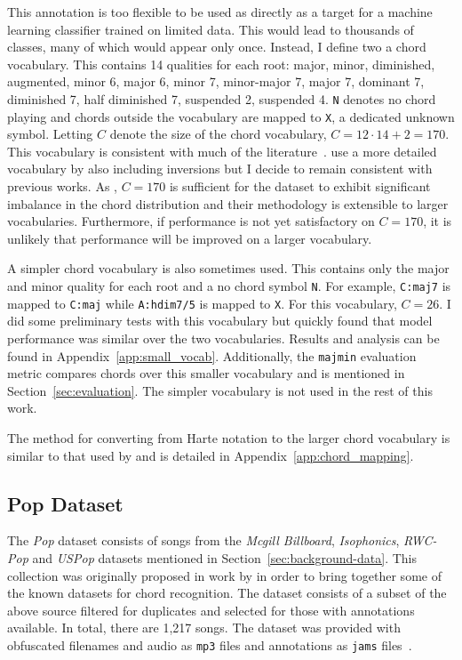 This annotation is too flexible to be used as directly as a target for a machine learning classifier trained on limited data. This would lead to thousands of classes, many of which would appear only once. Instead, I define two a chord vocabulary. This contains 14 qualities for each root: major, minor, diminished, augmented, minor 6, major 6, minor 7, minor-major 7, major 7, dominant 7, diminished 7, half diminished 7, suspended 2, suspended 4. \texttt{N} denotes no chord playing and chords outside the vocabulary are mapped to \texttt{X}, a dedicated unknown symbol. Letting $C$ denote the size of the chord vocabulary, $C=12\cdot14 + 2 = 170$. This vocabulary is consistent with much of the literature~\citep{StructuredTraining,FourTimelyInsights,ACRLargeVocab1}. \citet{ACRLargeVocab1} use a more detailed vocabulary by also including inversions but I decide to remain consistent with previous works. As \citet{StructuredTraining}, $C=170$ is sufficient for the dataset to exhibit significant imbalance in the chord distribution and their methodology is extensible to larger vocabularies. Furthermore, if performance is not yet satisfactory on $C=170$, it is unlikely that performance will be improved on a larger vocabulary.

A simpler chord vocabulary is also sometimes used. This contains only the major and minor quality for each root and a no chord symbol \texttt{N}. For example, \texttt{C:maj7} is mapped to \texttt{C:maj} while \texttt{A:hdim7/5} is mapped to \texttt{X}. For this vocabulary, $C=26$. I did some preliminary tests with this vocabulary but quickly found that model performance was similar over the two vocabularies. Results and analysis can be found in Appendix~\ref{app:small_vocab}. Additionally, the \texttt{majmin} evaluation metric compares chords over this smaller vocabulary and is mentioned in Section~\ref{sec:evaluation}. The simpler vocabulary is not used in the rest of this work.

The method for converting from Harte notation to the larger chord vocabulary is similar to that used by \citet{StructuredTraining} and is detailed in Appendix~\ref{app:chord_mapping}.

\subsection{Pop Dataset}

The \emph{Pop} dataset consists of songs from the \emph{Mcgill Billboard}, \emph{Isophonics}, \emph{RWC-Pop} and \emph{USPop} datasets mentioned in Section~\ref{sec:background-data}. This collection was originally proposed in work by \citet{FourTimelyInsights} in order to bring together some of the known datasets for chord recognition. The dataset consists of a subset of the above source filtered for duplicates and selected for those with annotations available. In total, there are 1,217 songs. The dataset was provided with obfuscated filenames and audio as \texttt{mp3} files and annotations as \texttt{jams} files~\citep{JAMS}. 


